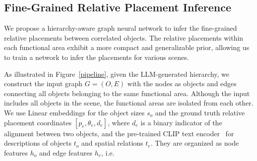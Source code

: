 \subsection{Fine-Grained Relative Placement Inference}
We propose a hierarchy-aware graph neural network to infer the fine-grained relative placements between correlated objects. The relative placements within each functional area exhibit a more compact and generalizable prior, allowing us to train a network to infer the placements for various scenes.

As illustrated in Figure~\ref{pipeline}, given the LLM-generated hierarchy, we construct the input graph $G=(O,E)$ with the nodes as objects and edges connecting all objects belonging to the same functional area. Although the input includes all objects in the scene, the functional areas are isolated from each other. We use Linear embeddings for the object sizes $s_o$ and the ground truth relative placement coordinates $[p_e, \theta_e, d_e]$, where $d_e$ is a binary indicator of the alignment between two objects, and the pre-trained CLIP text encoder~\cite{radford2021learningtransferablevisualmodels} for descriptions of objects $t_o$ and spatial relations $t_e$. They are organized as node features $h_o$ and edge features $h_e$, i.e.

